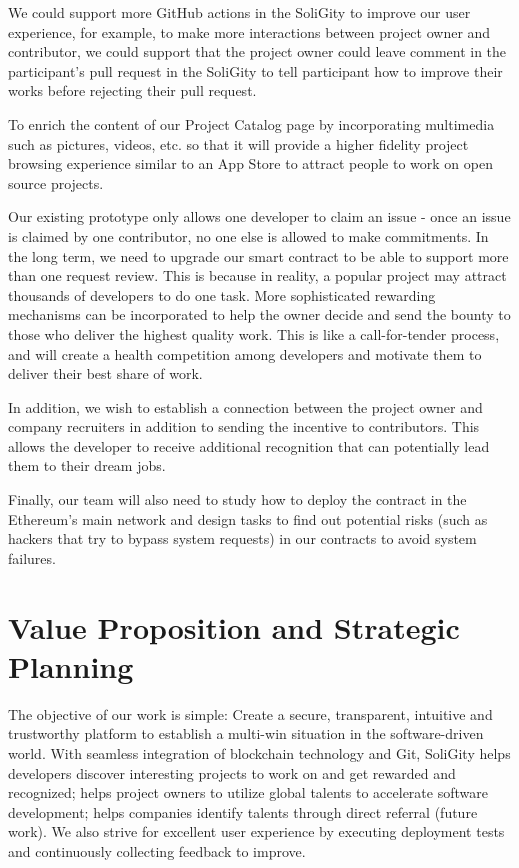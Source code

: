 \documentclass[12pt]{article}
\renewcommand{\_}{\kern-1.5pt\textunderscore\kern-1.5pt}
\begin{document}
We could support more GitHub actions in the SoliGity to improve our user experience, for example, to make more
interactions between project owner and contributor, we could support that the project owner could leave comment
in the participant's pull request in the SoliGity to tell participant how to improve their works before rejecting
their pull request.

To enrich the content of our Project Catalog page by incorporating multimedia such as pictures, videos, etc. so
that it will provide a higher fidelity project browsing experience similar to an App Store to attract people to
work on open source projects.

Our existing prototype only allows one developer to claim an issue - once an issue is claimed by one contributor,
no one else is allowed to make commitments. In the long term, we need to upgrade our smart contract to be able to
support more than one request review. This is because in reality, a popular project may attract thousands of
developers to do one task. More sophisticated rewarding mechanisms can be incorporated to help the owner decide
and send the bounty to those who deliver the highest quality work. This is like a call-for-tender process, and
will create a health competition among developers and motivate them to deliver their best share of work.

In addition, we wish to establish a connection between the project owner and company recruiters in addition to
sending the incentive to contributors. This allows the developer to receive additional recognition that can
potentially lead them to their dream jobs.

Finally, our team will also need to study how to deploy the contract in the Ethereum’s main network and design
tasks to find out potential risks (such as hackers that try to bypass system requests) in our contracts to avoid
system failures.

\section{Value Proposition and Strategic Planning}
The objective of our work is simple: Create a secure, transparent, intuitive and trustworthy platform to establish
a multi-win situation in the software-driven world. With seamless integration of blockchain technology and Git,
SoliGity helps developers discover interesting projects to work on and get rewarded and recognized; helps project
owners to utilize global talents to accelerate software development; helps companies identify talents through direct
referral (future work). We also strive for excellent user experience by executing deployment tests and continuously
collecting feedback to improve.
\end{document}
